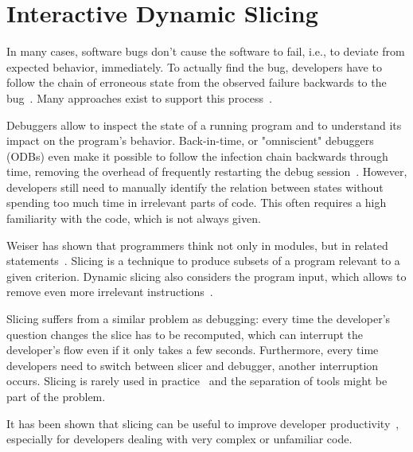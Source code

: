 \chapter{Interactive Dynamic Slicing}

\tmpStart
In many cases, software bugs don't cause the software to fail, i.e., to deviate from expected behavior, immediately.
To actually find the bug, developers have to follow the chain of erroneous state from the observed failure backwards to the bug~\cite{zeller_why_2009}.
Many approaches exist to support this process~\cite{wong_survey_2016}.

Debuggers allow to inspect the state of a running program and to understand its impact on the program's behavior.
Back-in-time, or "omniscient" debuggers (ODBs) even make it possible to follow the infection chain backwards through time, removing the overhead of frequently restarting the debug session~\cite{lewis_debugging_2003}.
However, developers still need to manually identify the relation between states without spending too much time in irrelevant parts of code.
This often requires a high familiarity with the code, which is not always given.
%

Weiser has shown that programmers think not only in modules, but in related statements~\cite{weiser_programmers_1982}.
Slicing is a technique to produce subsets of a program relevant to a given criterion.
Dynamic slicing also considers the program input, which allows to remove even more irrelevant instructions~\cite{agrawal_dynamic_1990}.

Slicing suffers from a similar problem as debugging:
every time the developer's question changes the slice has to be recomputed, which can interrupt the developer's flow even if it only takes a few seconds.
Furthermore, every time developers need to switch between slicer and debugger, another interruption occurs.
Slicing is rarely used in practice~\cite{perscheid_studying_2017} and the separation of tools might be part of the problem.

It has been shown that slicing can be useful to improve developer productivity~\cite{weiser_programmers_1982, agrawal_dynamic_1990}, especially for developers dealing with very complex or unfamiliar code.

